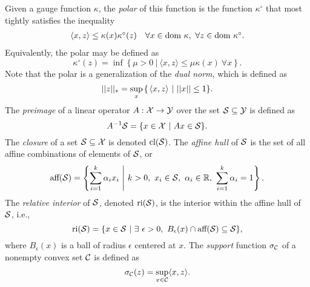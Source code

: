 Given a gauge function $\kappa$, the \textit{polar} of this function is the function $\kappa^\circ$ that most tightly satisfies the inequality
\begin{equation}  			\label{Def:polar_function_1}
\begin{array}{ll}
	\langle x, z \rangle \leq \kappa(x) \kappa^\circ(z)
			&	\forall x \in \textnormal{dom} \ \kappa, \ \forall z \in \textnormal{dom} \ \kappa^\circ.
\end{array}
\end{equation}
Equivalently, the polar may be defined as \cite[Section 15]{rockafellar1970convex}
\begin{equation}  			\label{Def:polar_function_2}
\kappa^\circ(z) = \inf \left\{ \mu > 0 \ | \ \langle x, z \rangle \leq \mu \kappa(x) \ \forall x \right\}.
\end{equation}
Note that the polar is a generalization of the \textit{dual norm}, which is defined as
\begin{equation}			\label{Def:dual_norm}
||z||_* = \sup_{x} \halfspace \{ \halfspace  \langle x, z \rangle \ | \ ||x|| \leq 1 \}.
\end{equation}
The \textit{preimage} of a linear operator $A: {\mathcal X} \rightarrow {\mathcal Y}$ over the set ${\mathcal S} \subseteq {\mathcal Y}$ is defined as 
\begin{equation} 			\label{Def:preimage}
A^{-1} {\mathcal S} = \{ x \in {\mathcal X} \ | \ Ax \in {\mathcal S} \}.
\end{equation}
The \textit{closure} of a set ${\mathcal S} \subseteq {\mathcal X}$ is denoted $\textnormal{cl}({\mathcal S})$. The \textit{affine hull} of ${\mathcal S}$ is the set of all affine combinations of elements of ${\mathcal S}$, or
\begin{equation}			\label{Def:affine_hull}
\text{aff}({\mathcal S}) = \left\{ \sum_{i=1}^k \alpha_i x_i \ \middle| \ k > 0, \ x_i \in {\mathcal S}, \ \alpha_i \in {\mathbb R}, \ \sum_{i=1}^k \alpha_i = 1 \right\}.
\end{equation}
The \textit{relative interior} of ${\mathcal S}$, denoted $\textnormal{ri}({\mathcal S})$, is the interior within the affine hull of ${\mathcal S}$, i.e.,
\begin{equation}			\label{Def:relative_interior}
\text{ri}(\caS) = \{ x \in \caS \ | \ \exists \ \epsilon > 0, \ B_\epsilon(x) \cap \text{aff}(\caS) \subseteq \caS  \},
\end{equation}
where $B_\epsilon(x)$ is a ball of radius $\epsilon$ centered at $x$.
The \textit{support} function $\sigma_{\mathcal C}$ of a nonempty convex set ${\mathcal C}$ is defined as
\begin{equation}		\label{Def:support_function}
\sigma_{\mathcal C}(z) = \sup_{x \in {\mathcal C}} \langle x, z \rangle.
\end{equation}
